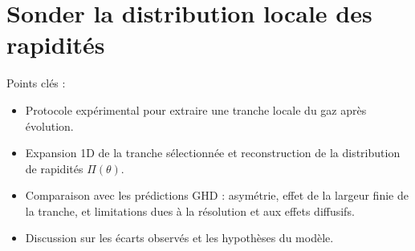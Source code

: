 


\section{Sonder la distribution locale des rapidités}
\label{sec:local}

{\color{blue}
Points clés :
\begin{itemize}
	\item Protocole expérimental pour extraire une tranche locale du gaz après évolution.
	\item Expansion 1D de la tranche sélectionnée et reconstruction de la distribution de rapidités $\Pi(\theta)$.
	\item Comparaison avec les prédictions GHD : asymétrie, effet de la largeur finie de la tranche, et limitations dues à la résolution et aux effets diffusifs.
	\item Discussion sur les écarts observés et les hypothèses du modèle.
\end{itemize}

}

